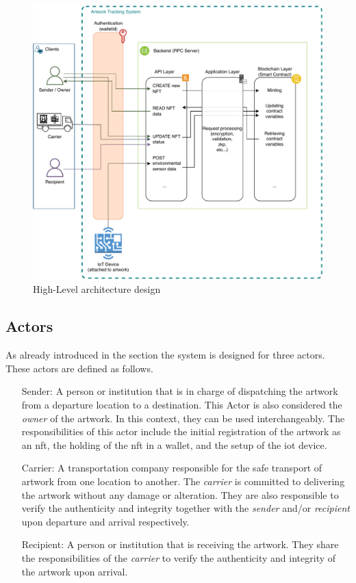 \begin{figure}[ht]
    \centering
    \includegraphics[height=0.5\textheight, keepaspectratio]{diagrams/Architecture.drawio.pdf}
    \caption{High-Level architecture design}
    \label{fig:architecture}
\end{figure}

\subsection{Actors}
As already introduced in the section  the system is designed for three actors. These actors are defined as follows.
\begin{itemize}[align=left, font=\itshape]
    \item[Sender:] A person or institution that is in charge of dispatching the artwork from a departure location to a destination. This Actor is also considered the \textit{owner} of the artwork. In this context, they can be used interchangeably. The responsibilities of this actor include the initial registration of the artwork as an \gls{nft}, the holding of the \gls{nft} in a \gls{wallet}, and the setup of the \gls{iot} device.

    \item[Carrier:] A transportation company responsible for the safe transport of artwork from one location to another. The \textit{carrier} is committed to delivering the artwork without any damage or alteration. They are also responsible to verify the authenticity and integrity together with the \textit{sender} and/or \textit{recipient} upon departure and arrival respectively.

    \item[Recipient:] A person or institution that is receiving the artwork. They share the responsibilities of the \textit{carrier} to verify the authenticity and integrity of the artwork upon arrival. 
\end{itemize}


